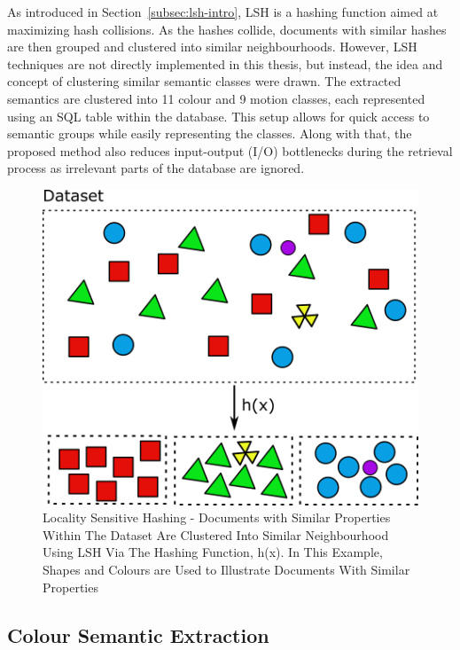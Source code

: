 As introduced in Section~\ref{subsec:lsh-intro}, LSH is a hashing function aimed at maximizing hash collisions.
As the hashes collide, documents with similar hashes are then grouped and clustered into similar neighbourhoods.
However, LSH techniques are not directly implemented in this thesis, but instead, the idea and concept of clustering similar semantic classes were drawn.
The extracted semantics are clustered into 11 colour and 9 motion classes, each represented using an SQL table within the database.
This setup allows for quick access to semantic groups while easily representing the classes. Along with that, the proposed method also reduces input-output (I/O) bottlenecks during the retrieval process as irrelevant parts of the database are ignored.


\begin{figure}[hbt!]\centering
\includegraphics[width=.7\textwidth]{image/new/lsh.png}
\caption{Locality Sensitive Hashing - Documents with Similar Properties Within The Dataset Are Clustered Into Similar Neighbourhood Using LSH Via The Hashing Function, h(x). In This Example, Shapes and Colours are Used to Illustrate Documents With Similar Properties}
\label{fig:lshexample}
\end{figure}

\vspace{1em}
\subsection{Colour Semantic Extraction }
\label{section:versionOneColorExtract}

